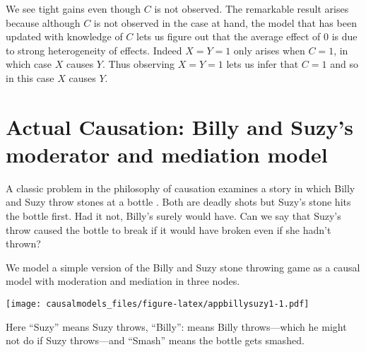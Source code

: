 \documentclass[
  12pt,
]{book}
\newenvironment{Shaded}{\begin{snugshade}}{\end{snugshade}}
\newcommand{\CommentTok}[1]{\textcolor[rgb]{0.56,0.35,0.01}{\textit{#1}}}
\newcommand{\KeywordTok}[1]{\textcolor[rgb]{0.13,0.29,0.53}{\textbf{#1}}}
\newcommand{\NormalTok}[1]{#1}
\newcommand{\OperatorTok}[1]{\textcolor[rgb]{0.81,0.36,0.00}{\textbf{#1}}}
\newcommand{\StringTok}[1]{\textcolor[rgb]{0.31,0.60,0.02}{#1}}
\begin{document}
We see tight gains even though \(C\) is not observed. The remarkable result arises because although \(C\) is not observed in the case at hand, the model that has been updated with knowledge of \(C\) lets us figure out that the average effect of 0 is due to strong heterogeneity of effects. Indeed \(X=Y=1\) only arises when \(C=1\), in which case \(X\) causes \(Y\). Thus observing \(X=Y=1\) lets us infer that \(C=1\) and so in this case \(X\) causes \(Y\).

\hypertarget{Billy}{%
\section{Actual Causation: Billy and Suzy's moderator and mediation model}\label{Billy}}

A classic problem in the philosophy of causation examines a story in which Billy and Suzy throw stones at a bottle \citep{hall2004two}. Both are deadly shots but Suzy's stone hits the bottle first. Had it not, Billy's surely would have. Can we say that Suzy's throw caused the bottle to break if it would have broken even if she hadn't thrown?

We model a simple version of the Billy and Suzy stone throwing game as a causal model with moderation and mediation in three nodes.

\begin{Shaded}
\end{Shaded}

\texttt{[image: causalmodels\_files/figure-latex/appbillysuzy1-1.pdf]}

Here ``Suzy'' means Suzy throws, ``Billy'': means Billy throws---which he might not do if Suzy throws---and ``Smash'' means the bottle gets smashed.
\end{document}
